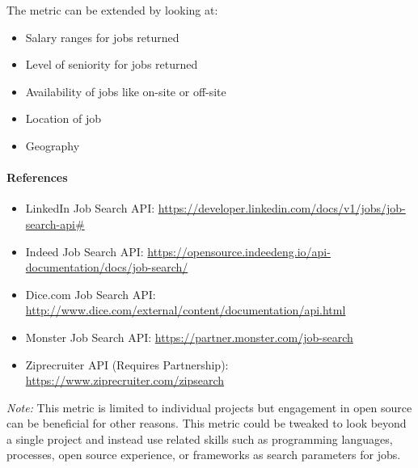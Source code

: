 The metric can be extended by looking at:

\begin{itemize}
\tightlist
\item
  Salary ranges for jobs returned
\item
  Level of seniority for jobs returned
\item
  Availability of jobs like on-site or off-site
\item
  Location of job
\item
  Geography
\end{itemize}

\hypertarget{references}{%
\paragraph{References}\label{references}}

\begin{itemize}
\tightlist
\item
  LinkedIn Job Search API:
  \url{https://developer.linkedin.com/docs/v1/jobs/job-search-api\#}
\item
  Indeed Job Search API:
  \url{https://opensource.indeedeng.io/api-documentation/docs/job-search/}
\item
  Dice.com Job Search API:
  \url{http://www.dice.com/external/content/documentation/api.html}
\item
  Monster Job Search API: \url{https://partner.monster.com/job-search}
\item
  Ziprecruiter API (Requires Partnership):
  \url{https://www.ziprecruiter.com/zipsearch}
\end{itemize}

\emph{Note:} This metric is limited to individual projects but
engagement in open source can be beneficial for other reasons. This
metric could be tweaked to look beyond a single project and instead use
related skills such as programming languages, processes, open source
experience, or frameworks as search parameters for jobs.
